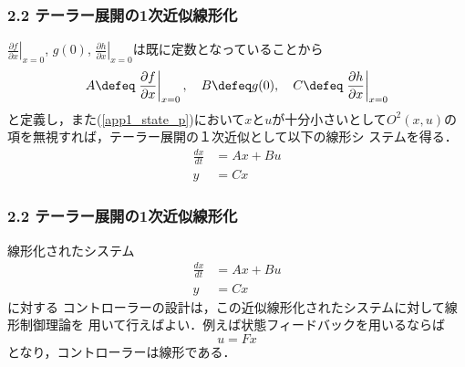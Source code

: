\begin{frame}[t]
\frametitle{2.2 テーラー展開の1次近似線形化}
$\left. \frac{\partial f}{\partial x} \right \vert _{x=0}$, $
g(0)$, $\left. \frac{\partial h}{\partial x} \right \vert _{x=0}$は既に定数となっていることから
\begin{equation}
 A \defeq \left.\frac{\partial f}{\partial x} \right \vert _{x=0},
  \quad	B \defeq g(0),
  \quad	C \defeq \left. \frac{\partial h}{\partial x} \right \vert _{x=0}
\end{equation}
と定義し，また(\ref{app1_state_p})において$x$と$u$が十分小さいとして$
O^2(x, u)$の項を無視すれば，テーラー展開の１次近似として以下の線形シ
ステムを得る．
\begin{align}
 \frac{dx}{dt} &= A x + B u
  \label{first_approx}
\\
 y&= C x
\end{align}
\end{frame}

\begin{frame}[t]
\frametitle{2.2 テーラー展開の1次近似線形化}
\addtocounter{equation}{-2}
線形化されたシステム
\begin{align}
 \frac{dx}{dt} &= A x + B u
\\
 y&= C x
\end{align}
に対する
コントローラーの設計は，この近似線形化されたシステムに対して線形制御理論を
用いて行えばよい．例えば状態フィードバックを用いるならば
\begin{equation}
 u = Fx
\end{equation}
となり，コントローラーは線形である．

\end{frame}

